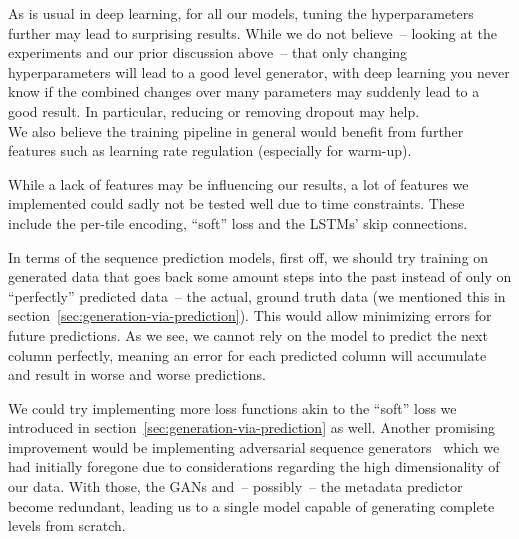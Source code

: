 As is usual in deep learning, for all our models, tuning the
hyperparameters further may lead to surprising results. While we do
not believe~-- looking at the experiments and our prior discussion
above~-- that only changing hyperparameters will lead to a good level
generator, with deep learning you never know if the combined changes
over many parameters may suddenly lead to a good result. In
particular, reducing or removing dropout may help. \\
We also believe the training pipeline in general would benefit from
further features such as learning rate regulation (especially for
warm-up).

While a lack of features may be influencing our results, a lot of
features we implemented could sadly not be tested well due to time
constraints. These include the per-tile encoding, ``soft'' loss and
the LSTMs' skip connections.

In terms of the sequence prediction models, first off, we should try
training on generated data that goes back some amount steps into the
past instead of only on ``perfectly'' predicted data~-- the actual,
ground truth data (we mentioned this in
section~\ref{sec:generation-via-prediction}). This would allow
minimizing errors for future predictions. As we see, we cannot rely on
the model to predict the next column perfectly, meaning an error for
each predicted column will accumulate and result in worse and worse
predictions.

We could try implementing more loss functions akin to the ``soft''
loss we introduced in section~\ref{sec:generation-via-prediction} as
well. Another promising improvement would be implementing adversarial
sequence
generators~\cite{yuSeqGANSequenceGenerative2017,liAdversarialDiscreteSequence}
which we had initially foregone due to considerations regarding the
high dimensionality of our data. With those, the GANs and~-- possibly~--
the metadata predictor become redundant, leading us to a single model
capable of generating complete levels from scratch.



